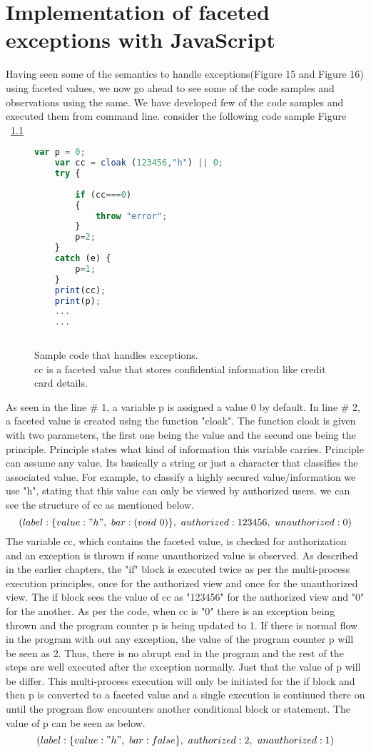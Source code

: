 \chapter{Implementation of faceted exceptions with JavaScript}
Having seen some of the semantics to handle exceptions(Figure 15 and Figure 16) using faceted values, we now go ahead to see some of the code samples and observations using the same. We have developed few of the code samples and executed them from command line. consider the following code sample Figure ~\ref{fig:JSExcepcode}

\begin{figure}
  \centering
\begin{lstlisting}[language=JavaScript] 
	var p = 0;
	var cc = cloak (123456,"h") || 0;
	try {
		
		if (cc===0)
		{
			throw "error";
		}
		p=2;
	}
	catch (e) {
		p=1;
	}
	print(cc);
	print(p);
	...
	...
	
\end{lstlisting}
    \caption[Sample code that handles exceptions.]
    {Sample code that handles exceptions.\\ cc is a faceted value that stores confidential information like credit card details.}
    \label{fig:JSExcepcode}
\end{figure}

As seen in the line \# 1, a variable p is assigned a value 0 by default. In line \# 2, a faceted value is created using the function "cloak". The function cloak is given with two parameters, the first one being the value and the second one being the principle. Principle states what kind of information this variable carries. Principle can assume any value. Its basically a string or just a character that classifies the associated value. For example, to classify a highly secured value/information we use "h", stating that this value can only be viewed by authorized users. we can see the structure of cc as mentioned below.
$$
({label:\{value:"h",\ bar:(void\ 0)\},\ authorized:123456,\ unauthorized:0})
$$
The variable cc, which contains the faceted value, is checked for authorization and an exception is thrown if some unauthorized value is observed. As described in the earlier chapters, the "if" block is executed twice as per the multi-process execution principles, once for the authorized view and once for the unauthorized view. The if block sees the value of cc as "123456" for the authorized view and "0" for the another. As per the code, when cc is "0" there is an exception being thrown and the program counter p is being updated to 1. If there is normal flow in the program with out any exception, the value of the program counter p will be seen as 2. Thus, there is no abrupt end in the program and the rest of the steps are well executed after the exception normally. Just that the value of p will be differ. This multi-process execution will only be initiated for the if block and then p is converted to a faceted value and a single execution is continued there on until the program flow encounters another conditional block or statement. The value of p can be seen as below.
$$
({label:\{value:"h",\ bar:false\},\ authorized:2,\ unauthorized:1})
$$

